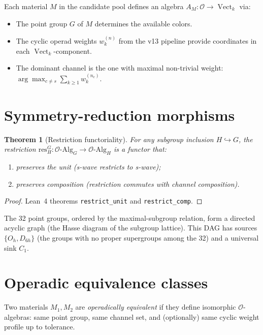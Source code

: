 \documentclass[11pt,a4paper]{article}
\newtheorem{theorem}{Theorem}[section]
\DeclareMathOperator{\Vect}{Vect}
\newcommand{\OO}{\mathcal{O}}
\newcommand{\kk}{k}
\begin{document}
Each material $M$ in the candidate pool defines an algebra
$A_M \colon \OO \to \Vect_\kk$ via:
\begin{itemize}
  \item The point group $G$ of $M$ determines the available colors.
  \item The cyclic operad weights $w_k^{(n)}$ from the v13 pipeline
        provide coordinates in each $\Vect_\kk$-component.
  \item The dominant channel is the one with maximal non-trivial
        weight: $\arg\max_{c \neq s} \sum_{k \geq 1} w_k^{(n_c)}$.
\end{itemize}

\section{Symmetry-reduction morphisms}\label{sec:morphisms}

\begin{theorem}[Restriction functoriality]\label{thm:restriction}
  For any subgroup inclusion $H \hookrightarrow G$, the restriction
  $\mathrm{res}^G_H \colon \OO\text{-Alg}_G \to \OO\text{-Alg}_H$
  is a functor that:
  \begin{enumerate}
    \item preserves the unit (s-wave restricts to s-wave);
    \item preserves composition (restriction commutes with channel
          composition).
  \end{enumerate}
\end{theorem}

\begin{proof}
  Lean~4 theorems \texttt{restrict\_unit} and
  \texttt{restrict\_comp}.
\end{proof}

The 32 point groups, ordered by the maximal-subgroup relation, form a
directed acyclic graph (the Hasse diagram of the subgroup lattice).
This DAG has sources $\{O_h, D_{6h}\}$ (the groups with no proper
supergroups among the 32) and a universal sink $C_1$.

\section{Operadic equivalence classes}\label{sec:equivalence}

Two materials $M_1, M_2$ are \emph{operadically equivalent} if they
define isomorphic $\OO$-algebras: same point group, same channel set,
and (optionally) same cyclic weight profile up to tolerance.
\end{document}
